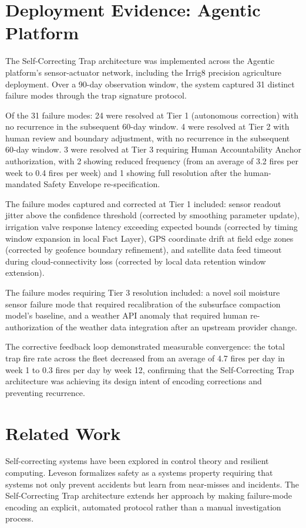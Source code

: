 \documentclass[12pt]{article}
\begin{document}
\section{Deployment Evidence: Agentic Platform}
The Self-Correcting Trap architecture was implemented across the Agentic platform's sensor-actuator network, including the Irrig8 precision agriculture deployment. Over a 90-day observation window, the system captured 31 distinct failure modes through the trap signature protocol.

Of the 31 failure modes: 24 were resolved at Tier 1 (autonomous correction) with no recurrence in the subsequent 60-day window. 4 were resolved at Tier 2 with human review and boundary adjustment, with no recurrence in the subsequent 60-day window. 3 were resolved at Tier 3 requiring Human Accountability Anchor authorization, with 2 showing reduced frequency (from an average of 3.2 fires per week to 0.4 fires per week) and 1 showing full resolution after the human-mandated Safety Envelope re-specification.

The failure modes captured and corrected at Tier 1 included: sensor readout jitter above the confidence threshold (corrected by smoothing parameter update), irrigation valve response latency exceeding expected bounds (corrected by timing window expansion in local Fact Layer), GPS coordinate drift at field edge zones (corrected by geofence boundary refinement), and satellite data feed timeout during cloud-connectivity loss (corrected by local data retention window extension).

The failure modes requiring Tier 3 resolution included: a novel soil moisture sensor failure mode that required recalibration of the subsurface compaction model's baseline, and a weather API anomaly that required human re-authorization of the weather data integration after an upstream provider change.

The corrective feedback loop demonstrated measurable convergence: the total trap fire rate across the fleet decreased from an average of 4.7 fires per day in week 1 to 0.3 fires per day by week 12, confirming that the Self-Correcting Trap architecture was achieving its design intent of encoding corrections and preventing recurrence.

\section{Related Work}
Self-correcting systems have been explored in control theory and resilient computing. Leveson \cite{leveson2011} formalizes safety as a systems property requiring that systems not only prevent accidents but learn from near-misses and incidents. The Self-Correcting Trap architecture extends her approach by making failure-mode encoding an explicit, automated protocol rather than a manual investigation process.
\end{document}
